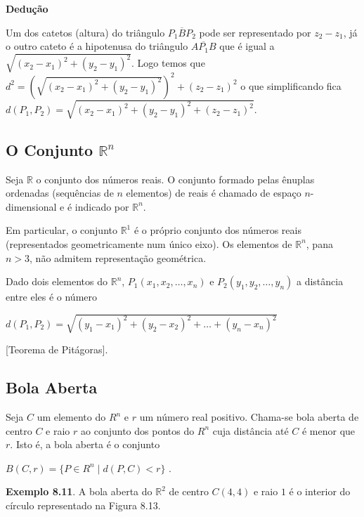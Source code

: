 		\textbf{Dedução}

		Um dos catetos (altura) do triângulo $\overline{P_{1}BP_{2}}$ pode ser representado por $z_{2} - z_{1}$, já o outro cateto é a hipotenusa do triângulo $\overline{AP_{1}B}$ que é igual a $\sqrt{(x_{2} - x_{1})^{2} + (y_{2} - y_{1})^{2}}$. Logo temos que $d^{2} = (\sqrt{(x_{2} - x_{1})^{2} + (y_{2} - y_{1})^{2}})^{2} + (z_{2} - z_{1})^{2}$ o que simplificando fica $d(P_{1}, P_{2}) = \sqrt{(x_{2} - x_{1})^{2} + (y_{2} - y_{1})^{2} + (z_{2} - z_{1})^{2}}$.
		
	\subsection{O Conjunto $\mathbb{R}^{n}$ \cite{morettin}}

		Seja $\mathbb{R}$ o conjunto dos números reais. O conjunto formado pelas ênuplas ordenadas (sequências de $n$ elementos) de reais é chamado de espaço $n$-dimensional e é indicado por $\mathbb{R}^{n}$.

		Em particular, o conjunto $\mathbb{R}^{1}$ é o próprio conjunto dos números reais (representados geometricamente num único eixo). Os elementos de $\mathbb{R}^{n}$, pana $n > 3$, não admitem representação geométrica.

		Dado dois elementos do $\mathbb{R}^{n}$, $P_{1}(x_{1}, x_{2}, \dots , x_{n})$ e $P_{2}(y_{1}, y_{2}, \dots , y_{n})$ a distância entre eles é o número

		\bigskip

		{\LARGE $d(P_{1}, P_{2}) = \sqrt{(y_{1} - x_{1})^{2} + (y_{2} - x_{2})^{2} + \dots + (y_{n} - x_{n})^{2}}$}
		
		[Teorema de Pitágoras].
		
	\subsection{Bola Aberta \cite{morettin}}

		Seja $C$ um elemento do $R^{n}$ e $r$ um número real positivo. Chama-se bola aberta de centro $C$ e raio $r$ ao conjunto dos pontos do $R^{n}$ cuja distância até $C$ é menor que $r$. Isto é, a bola aberta é o conjunto

		\bigskip

		{\LARGE $B(C, r) = \{P \in R^{n} \mid d(P, C) < r\}$} .

		\bigskip

		\textbf{Exemplo 8.11}. A bola aberta do $\mathbb{R}^{2}$ de centro $C(4, 4)$ e raio $1$ é o interior do círculo representado na Figura 8.13.
		

